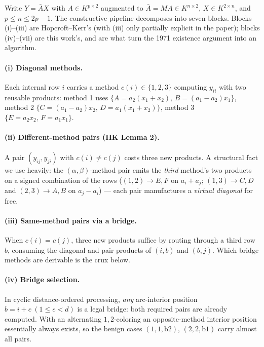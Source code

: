 Write \(Y = \bar A X\) with \(A \in K^{p\times 2}\) augmented to
\(\bar A = MA \in K^{n\times 2}\), \(X \in K^{2\times n}\), and
\(p \le n \le 2p-1\). The constructive pipeline decomposes into seven blocks.
Blocks (i)--(iii) are Hopcroft--Kerr's (with (iii) only partially explicit in
the paper); blocks (iv)--(vii) are this work's, and are what turn the 1971
existence argument into an algorithm.

\paragraph{(i) Diagonal methods.} Each internal row \(i\) carries a method
\(c(i)\in\{1,2,3\}\) computing \(y_{ii}\) with two reusable products:
method 1 uses \(\{A{=}a_2(x_1{+}x_2),\,B{=}(a_1{-}a_2)x_1\}\), method 2
\(\{C{=}(a_1{-}a_2)x_2,\,D{=}a_1(x_1{+}x_2)\}\), method 3
\(\{E{=}a_2x_2,\,F{=}a_1x_1\}\).

\paragraph{(ii) Different-method pairs (HK Lemma 2).} A pair
\((y_{ij}, y_{ji})\) with \(c(i)\ne c(j)\) costs three new products. A
structural fact we use heavily: the \((\alpha,\beta)\)-method pair emits the
\emph{third} method's two products on a signed combination of the rows
(\((1,2)\to E,F\) on \(a_i{+}a_j\); \((1,3)\to C,D\) and \((2,3)\to A,B\) on
\(a_j{-}a_i\)) — each pair manufactures a \emph{virtual diagonal} for free.

\paragraph{(iii) Same-method pairs via a bridge.} When \(c(i)=c(j)\), three
new products suffice by routing through a third row \(b\), consuming the
diagonal and pair products of \((i,b)\) and \((b,j)\). Which bridge methods
are derivable is the crux below.

\paragraph{(iv) Bridge selection.} In cyclic distance-ordered processing,
\emph{any} arc-interior position \(b = i+e \ (1 \le e < d)\) is a legal
bridge: both required pairs are already computed. With an alternating
\(1,2\)-coloring an opposite-method interior position essentially always
exists, so the benign cases \((1,1,\mathrm{b}2)\), \((2,2,\mathrm{b}1)\)
carry almost all pairs.

